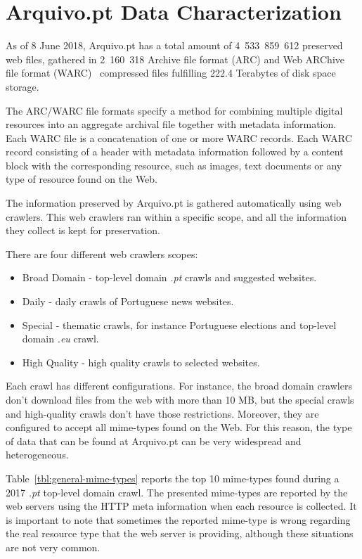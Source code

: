 \section{Arquivo.pt Data Characterization}
As of 8 June 2018, Arquivo.pt has a total amount of 4~533~859~612 preserved web files, gathered in 2~160~318 Archive file format (ARC) and Web ARChive file format (WARC)~\cite{isowarc} compressed files fulfilling 222.4 Terabytes of disk space storage.

The ARC/WARC file formats specify a method for combining multiple digital resources into an aggregate archival file together with metadata information. Each WARC file is a concatenation of one or more WARC records. Each WARC record consisting of a header with metadata information followed by a content block with the corresponding resource, such as images, text documents or any type of resource found on the Web.

The information preserved by Arquivo.pt is gathered automatically using web crawlers. This web crawlers ran within a specific scope, and all the information they collect is kept for preservation.

There are four different web crawlers scopes:
\begin{itemize}
    \item Broad Domain - top-level domain \emph{.pt} crawls and suggested websites.
    \item Daily - daily crawls of Portuguese news websites.
    \item Special - thematic crawls, for instance Portuguese elections and top-level domain \emph{.eu} crawl.
    \item High Quality  - high quality crawls to selected websites.
\end{itemize}

Each crawl has different configurations. For instance, the broad domain crawlers don't download files from the web with more than 10 MB, but the special crawls and high-quality crawls don't have those restrictions. Moreover, they are configured to accept all mime-types found on the Web. For this reason, the type of data that can be found at Arquivo.pt can be very widespread and heterogeneous.

Table~\ref{tbl:general-mime-types} reports the top 10 mime-types found during a 2017 \emph{.pt} top-level domain crawl. The presented mime-types are reported by the web servers using the HTTP meta information when each resource is collected. It is important to note that sometimes the reported mime-type is wrong regarding the real resource type that the web server is providing, although these situations are not very common.

